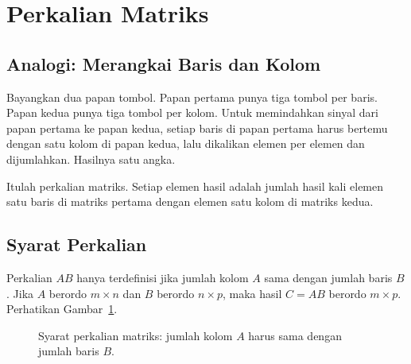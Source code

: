 \documentclass[11pt,a4paper]{article}
\begin{document}
\section{Perkalian Matriks}

\subsection{Analogi: Merangkai Baris dan Kolom}

Bayangkan dua papan tombol. Papan pertama punya tiga tombol per baris. Papan kedua punya tiga tombol per kolom. Untuk memindahkan sinyal dari papan pertama ke papan kedua, setiap baris di papan pertama harus bertemu dengan satu kolom di papan kedua, lalu dikalikan elemen per elemen dan dijumlahkan. Hasilnya satu angka.

Itulah perkalian matriks. Setiap elemen hasil adalah jumlah hasil kali elemen satu baris di matriks pertama dengan elemen satu kolom di matriks kedua.

\subsection{Syarat Perkalian}

Perkalian $AB$ hanya terdefinisi jika jumlah kolom $A$ sama dengan jumlah baris $B$. Jika $A$ berordo $m \times n$ dan $B$ berordo $n \times p$, maka hasil $C=AB$ berordo $m \times p$. Perhatikan Gambar~\ref{fig:syarat-perkalian}.

\begin{figure}[H]
	\centering
	\caption{Syarat perkalian matriks: jumlah kolom $A$ harus sama dengan jumlah baris $B$.}
	\label{fig:syarat-perkalian}
\end{figure}
\end{document}
